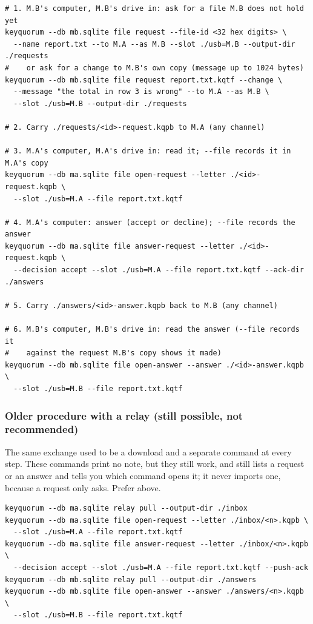 \begin{lstlisting}
# 1. M.B's computer, M.B's drive in: ask for a file M.B does not hold yet
keyquorum --db mb.sqlite file request --file-id <32 hex digits> \
  --name report.txt --to M.A --as M.B --slot ./usb=M.B --output-dir ./requests
#    or ask for a change to M.B's own copy (message up to 1024 bytes)
keyquorum --db mb.sqlite file request report.txt.kqtf --change \
  --message "the total in row 3 is wrong" --to M.A --as M.B \
  --slot ./usb=M.B --output-dir ./requests

# 2. Carry ./requests/<id>-request.kqpb to M.A (any channel)

# 3. M.A's computer, M.A's drive in: read it; --file records it in M.A's copy
keyquorum --db ma.sqlite file open-request --letter ./<id>-request.kqpb \
  --slot ./usb=M.A --file report.txt.kqtf

# 4. M.A's computer: answer (accept or decline); --file records the answer
keyquorum --db ma.sqlite file answer-request --letter ./<id>-request.kqpb \
  --decision accept --slot ./usb=M.A --file report.txt.kqtf --ack-dir ./answers

# 5. Carry ./answers/<id>-answer.kqpb back to M.B (any channel)

# 6. M.B's computer, M.B's drive in: read the answer (--file records it
#    against the request M.B's copy shows it made)
keyquorum --db mb.sqlite file open-answer --answer ./<id>-answer.kqpb \
  --slot ./usb=M.B --file report.txt.kqtf
\end{lstlisting}

\subsubsection*{Older procedure with a relay (still possible, not recommended)}

The same exchange used to be a download and a separate command at every step.
These \code{file} commands print no note, but they still work, and  still lists a request or an
answer and tells you which command opens it; it never imports one, because a
request only asks. Prefer  above.

\begin{lstlisting}
keyquorum --db ma.sqlite relay pull --output-dir ./inbox
keyquorum --db ma.sqlite file open-request --letter ./inbox/<n>.kqpb \
  --slot ./usb=M.A --file report.txt.kqtf
keyquorum --db ma.sqlite file answer-request --letter ./inbox/<n>.kqpb \
  --decision accept --slot ./usb=M.A --file report.txt.kqtf --push-ack
keyquorum --db mb.sqlite relay pull --output-dir ./answers
keyquorum --db mb.sqlite file open-answer --answer ./answers/<n>.kqpb \
  --slot ./usb=M.B --file report.txt.kqtf
\end{lstlisting}

